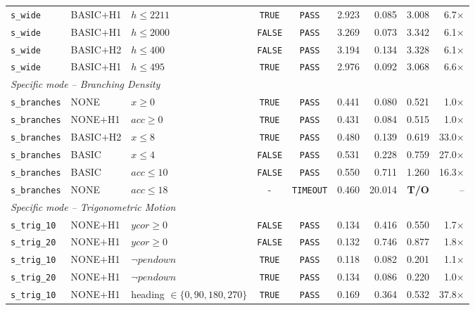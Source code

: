 {\begin{longtable}{p{} p{} p{} c c r r r r}
\texttt{s\_wide} & BASIC$+$H1 & $h \leq 2211$ & \texttt{TRUE} & \texttt{PASS} & 2.923 & 0.085 & 3.008 & 6.7$\times$ \\
\texttt{s\_wide} & BASIC$+$H1 & $h \leq 2000$ & \texttt{FALSE} & \texttt{PASS} & 3.269 & 0.073 & 3.342 & 6.1$\times$ \\
\texttt{s\_wide} & BASIC$+$H2 & $h \leq 400$ & \texttt{FALSE} & \texttt{PASS} & 3.194 & 0.134 & 3.328 & 6.1$\times$ \\
\texttt{s\_wide} & BASIC$+$H1 & $h \leq 495$ & \texttt{TRUE} & \texttt{PASS} & 2.976 & 0.092 & 3.068 & 6.6$\times$ \\
\midrule
\multicolumn{9}{l}{\textit{Specific mode -- Branching Density}} \\
\midrule
\texttt{s\_branches} & NONE & $x \geq 0$ & \texttt{TRUE} & \texttt{PASS} & 0.441 & 0.080 & 0.521 & 1.0$\times$ \\
\texttt{s\_branches} & NONE$+$H1 & $\mathit{acc} \geq 0$ & \texttt{TRUE} & \texttt{PASS} & 0.431 & 0.084 & 0.515 & 1.0$\times$ \\
\texttt{s\_branches} & BASIC$+$H2 & $x \leq 8$ & \texttt{TRUE} & \texttt{PASS} & 0.480 & 0.139 & 0.619 & 33.0$\times$ \\
\texttt{s\_branches} & BASIC & $x \leq 4$ & \texttt{FALSE} & \texttt{PASS} & 0.531 & 0.228 & 0.759 & 27.0$\times$ \\
\texttt{s\_branches} & BASIC & $\mathit{acc} \leq 10$ & \texttt{FALSE} & \texttt{PASS} & 0.550 & 0.711 & 1.260 & 16.3$\times$ \\
\texttt{s\_branches} & NONE & $\mathit{acc} \leq 18$ & - & {\color{red}\texttt{TIMEOUT}} & 0.460 & 20.014 & \textbf{T/O} & -- \\
\midrule
\multicolumn{9}{l}{\textit{Specific mode -- Trigonometric Motion}} \\
\midrule
\texttt{s\_trig\_10} & NONE$+$H1 & $\mathit{ycor} \geq 0$ & \texttt{FALSE} & \texttt{PASS} & 0.134 & 0.416 & 0.550 & 1.7$\times$ \\
\texttt{s\_trig\_20} & NONE$+$H1 & $\mathit{ycor} \geq 0$ & \texttt{FALSE} & \texttt{PASS} & 0.132 & 0.746 & 0.877 & 1.8$\times$ \\
\texttt{s\_trig\_10} & NONE$+$H1 & $\neg\mathit{pendown}$ & \texttt{TRUE} & \texttt{PASS} & 0.118 & 0.082 & 0.201 & 1.1$\times$ \\
\texttt{s\_trig\_20} & NONE$+$H1 & $\neg\mathit{pendown}$ & \texttt{TRUE} & \texttt{PASS} & 0.134 & 0.086 & 0.220 & 1.0$\times$ \\
\texttt{s\_trig\_10} & NONE$+$H1 & heading $\in \{0,90,180,270\}$ & \texttt{TRUE} & \texttt{PASS} & 0.169 & 0.364 & 0.532 & 37.8$\times$ \\

\end{longtable}}
